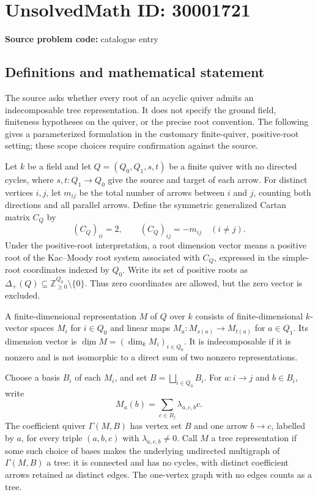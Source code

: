 \documentclass[11pt]{article}
\begin{document}
\section*{UnsolvedMath ID: 30001721}
\textbf{Source problem code:} catalogue entry
\subsection{Definitions and mathematical statement}
The source asks whether every root of an acyclic quiver admits an indecomposable tree representation. It does not specify the ground field, finiteness hypotheses on the quiver, or the precise root convention. The following gives a parameterized formulation in the customary finite-quiver, positive-root setting; these scope choices require confirmation against the source.

Let \(k\) be a field and let \(Q=(Q_0,Q_1,s,t)\) be a finite quiver with no directed cycles, where \(s,t:Q_1\to Q_0\) give the source and target of each arrow. For distinct vertices \(i,j\), let \(m_{ij}\) be the total number of arrows between \(i\) and \(j\), counting both directions and all parallel arrows. Define the symmetric generalized Cartan matrix \(C_Q\) by
\[
(C_Q)_{ii}=2,\qquad (C_Q)_{ij}=-m_{ij}\quad(i\ne j).
\]
Under the positive-root interpretation, a root dimension vector means a positive root of the Kac--Moody root system associated with \(C_Q\), expressed in the simple-root coordinates indexed by \(Q_0\). Write its set of positive roots as \(\Delta_+(Q)\subseteq\mathbb Z_{\ge0}^{Q_0}\setminus\{0\}\). Thus zero coordinates are allowed, but the zero vector is excluded.

A finite-dimensional representation \(M\) of \(Q\) over \(k\) consists of finite-dimensional \(k\)-vector spaces \(M_i\) for \(i\in Q_0\) and linear maps \(M_a:M_{s(a)}\to M_{t(a)}\) for \(a\in Q_1\). Its dimension vector is \(\underline{\dim}M=(\dim_k M_i)_{i\in Q_0}\). It is indecomposable if it is nonzero and is not isomorphic to a direct sum of two nonzero representations.

Choose a basis \(B_i\) of each \(M_i\), and set \(B=\bigsqcup_{i\in Q_0}B_i\). For \(a:i\to j\) and \(b\in B_i\), write
\[
M_a(b)=\sum_{c\in B_j}\lambda_{a,c,b}c.
\]
The coefficient quiver \(\Gamma(M,B)\) has vertex set \(B\) and one arrow \(b\to c\), labelled by \(a\), for every triple \((a,b,c)\) with \(\lambda_{a,c,b}\ne0\). Call \(M\) a tree representation if some such choice of bases makes the underlying undirected multigraph of \(\Gamma(M,B)\) a tree: it is connected and has no cycles, with distinct coefficient arrows retained as distinct edges. The one-vertex graph with no edges counts as a tree.
\end{document}
